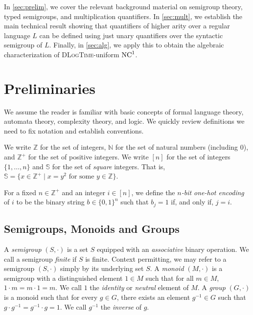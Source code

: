 \documentclass[a4paper,UKenglish,cleveref, autoref, thm-restate, anonymous]{lipics-v2021}
\begin{document}
In \autoref{sec:prelim}, we cover the relevant background material on semigroup theory, typed semigroups, and multiplication quantifiers.   In \autoref{sec:mult}, we establish the main technical result showing that quantifiers of higher arity over a regular language $L$ can be defined using just unary quantifiers over the syntactic semigroup of $L$.  Finally, in \autoref{sec:alg}, we apply this to obtain the algebraic characterization of \textsc{DLogTime}-uniform $\mathrm{NC}^1$.



\section{Preliminaries}\label{sec:prelim}


We assume the reader is familiar with basic concepts of formal language theory, automata theory, complexity theory, and logic.  We quickly review definitions we need to fix notation and establish conventions.

We write $\mathbb{Z}$ for the set of integers, $\mathbb{N}$ for the set of natural numbers (including $0$), and $\mathbb{Z}^+$ for the set of positive integers.
We write $[n]$ for the set of integers $\{1,\ldots,n\}$ and $\mathbb{S}$ for the set of \emph{square} integers.  That is, $\mathbb{S} = \{ x \in \mathbb{Z}^+ \mid x = y^2 \text{ for some } y \in \mathbb{Z}\}$.

For a fixed $n \in \mathbb{Z}^+$ and an integer $i \in [n]$, we define the \emph{$n$-bit one-hot encoding} of $i$ to be the binary string $b \in \{0,1\}^n$ such that $b_j = 1$ if, and only if,  $j = i$.

\subsection{Semigroups, Monoids and Groups}
\label{sec:backgroundsemi}

A \emph{semigroup} $(S, \cdot)$ is a set $S$ equipped with an \emph{associative} binary operation.  We call a semigroup \emph{finite} if $S$ is finite. Context permitting, we may refer to a semigroup $(S, \cdot)$ simply by its underlying set $S$.  A \emph{monoid} $(M, \cdot)$ is a semigroup with a distinguished element $1 \in M$ such that for all $m \in M$, $1 \cdot m = m \cdot 1 = m$.  We call $1$ the \emph{identity} or \emph{neutral} element of $M$.  A \emph{group} $(G, \cdot)$ is a monoid such that for every $g \in G$, there exists an element $g^{-1} \in G$ such that $g \cdot g^{-1} = g^{-1} \cdot g = 1$.  We call $g^{-1}$ the \emph{inverse} of $g$.  
\end{document}
